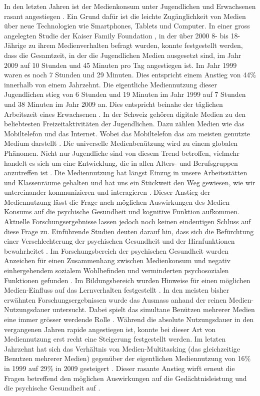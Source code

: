 In den letzten Jahren ist der Medienkonsum unter Jugendlichen und Erwachsenen rasant angestiegen \cite{Shih2013}. Ein Grund dafür ist die leichte Zugänglichkeit von Medien über neue Technologien wie Smartphones, Tablets und Computer. In einer gross angelegten Studie der Kaiser Family Foundation \cite{Rideout2010}, in der über 2000 8- bis 18-Jährige zu ihrem Medienverhalten befragt wurden, konnte festgestellt werden, dass die Gesamtzeit, in der die Jugendlichen Medien ausgesetzt sind, im Jahr 2009 auf 10 Stunden und 45 Minuten pro Tag angestiegen ist. Im Jahr 1999 waren es noch 7 Stunden und 29 Minuten. Dies entspricht einem Anstieg von 44\% innerhalb von einem Jahrzehnt. Die eigentliche Mediennutzung dieser Jugendlichen stieg von 6 Stunden und 19 Minuten im Jahr 1999 auf 7 Stunden und 38 Minuten im Jahr 2009 an. Dies entspricht beinahe der täglichen Arbeitszeit eines Erwachsenen \cite{Rideout2010}. In der Schweiz gehören digitale Medien zu den beliebtesten Freizeitaktivitäten der Jugendlichen. Dazu zählen Medien wie das Mobiltelefon und das Internet. Wobei das Mobiltelefon das am meisten genutzte Medium darstellt \cite{Willemse2012}. Die universelle Medienbenützung wird zu einem globalen Phänomen. Nicht nur Jugendliche sind von diesem Trend betroffen, vielmehr handelt es sich um eine Entwicklung, die in allen Alters- und Berufsgruppen anzutreffen ist \cite{Rogers2009}. Die Mediennutzung hat längst Einzug in unsere Arbeitsstätten und Klassenräume gehalten und hat uns ein Stückweit den Weg gewiesen, wie wir untereinander kommunizieren und interagieren \cite{Benson2002}. Dieser Anstieg der Mediennutzung lässt die Frage nach möglichen Auswirkungen des Medien-Konsums auf die psychische Gesundheit und kognitive Funktion aufkommen. Aktuelle Forschungsergebnisse lassen jedoch noch keinen eindeutigen Schluss auf diese Frage zu. Einführende Studien deuten darauf hin, dass sich die Befürchtung einer Verschlechterung der psychischen Gesundheit und der Hirnfunktionen bewahrheitet \cite{Biocca2000, Roberts2008}. Im Forschungsbereich der psychischen Gesundheit wurden Anzeichen für einen Zusammenhang zwischen Medienkonsum und negativ einhergehendem sozialem Wohlbefinden und verminderten psychosozialen Funktionen gefunden \cite{Kraut1998, Moody2001}. Im Bildungsbereich wurden Hinweise für einen möglichen Medien-Einfluss auf das Lernverhalten festgestellt \cite{Prensky2001}. In den meisten bisher erwähnten Forschungsergebnissen wurde das Ausmass anhand der reinen Medien-Nutzungsdauer untersucht. Dabei spielt das simultane Benützen mehrerer Medien eine immer grösser werdende Rolle \cite{Jeong2007}. Während die absolute Nutzungsdauer in den vergangenen Jahren rapide angestiegen ist, konnte bei dieser Art von Mediennutzung erst recht eine Steigerung festgestellt werden. Im letzten Jahrzehnt hat sich das Verhältnis von Medien-Multitasking (das gleichzeitige Benutzen mehrerer Medien) gegenüber der eigentlichen Mediennutzung von 16\% in 1999 auf 29\% in 2009 gesteigert \cite{Rideout2010}. Dieser rasante Anstieg wirft erneut die Fragen betreffend den möglichen Auswirkungen auf die Gedächtnisleistung und die psychische Gesundheit auf \cite{Alzahabi2013}. 

